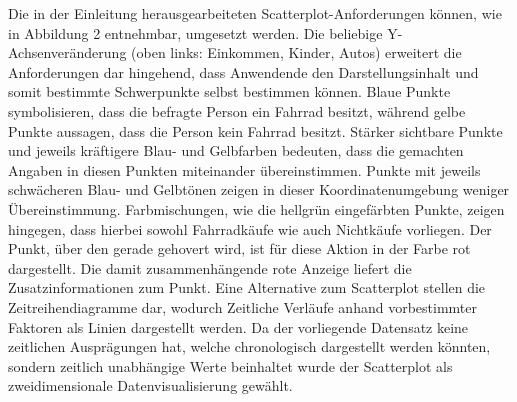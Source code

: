 \documentclass[usegeometry=true]{scrartcl}
\begin{document}
\newline Die in der Einleitung herausgearbeiteten Scatterplot-Anforderungen können, wie in Abbildung 2 entnehmbar, umgesetzt werden. Die beliebige Y-Achsenveränderung (oben links: Einkommen, Kinder, Autos) erweitert die Anforderungen dar hingehend, dass Anwendende den Darstellungsinhalt und somit bestimmte Schwerpunkte selbst bestimmen können. Blaue Punkte symbolisieren, dass die befragte Person ein Fahrrad besitzt, während gelbe Punkte aussagen, dass die Person kein Fahrrad besitzt. Stärker sichtbare Punkte und jeweils kräftigere Blau- und Gelbfarben bedeuten, dass die gemachten Angaben in diesen Punkten miteinander übereinstimmen. Punkte mit jeweils schwächeren Blau- und Gelbtönen zeigen in dieser Koordinatenumgebung weniger Übereinstimmung. Farbmischungen, wie die hellgrün eingefärbten Punkte, zeigen hingegen, dass hierbei sowohl Fahrradkäufe wie auch Nichtkäufe vorliegen. Der Punkt, über den gerade gehovert wird, ist für diese Aktion in der Farbe rot dargestellt. Die damit zusammenhängende rote Anzeige liefert die Zusatzinformationen zum Punkt.
Eine Alternative zum Scatterplot stellen die Zeitreihendiagramme dar, wodurch Zeitliche Verläufe anhand vorbestimmter Faktoren als Linien dargestellt werden. Da der vorliegende Datensatz keine zeitlichen Ausprägungen hat, welche chronologisch dargestellt werden könnten, sondern zeitlich unabhängige Werte beinhaltet wurde der Scatterplot als zweidimensionale Datenvisualisierung gewählt.
\end{document}
